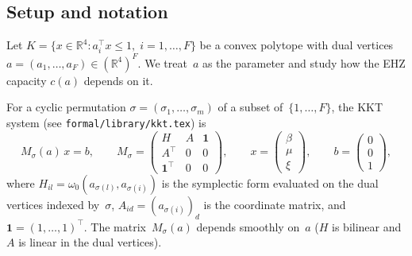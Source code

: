 %
%
%
%



\subsection*{Setup and notation}

Let $K = \{x \in \mathbb{R}^4 : a_i^\top x \leq 1,\; i = 1, \ldots, F\}$
be a convex polytope with dual vertices
$a = (a_1, \ldots, a_F) \in (\mathbb{R}^4)^F$.
We treat~$a$ as the parameter and study how the EHZ capacity
$c(a)$ depends on it.

For a cyclic permutation $\sigma = (\sigma_1, \ldots, \sigma_m)$
of a subset of~$\{1, \ldots, F\}$,
the KKT system (see \texttt{formal/library/kkt.tex}) is
\begin{equation}\label{eq:kkt-system}
  M_\sigma(a)\, x = b,
  \qquad
  M_\sigma = \begin{pmatrix}
    H & A & \mathbf{1} \\
    A^\top & 0 & 0 \\
    \mathbf{1}^\top & 0 & 0
  \end{pmatrix},
  \qquad
  x = \begin{pmatrix} \beta \\ \mu \\ \xi \end{pmatrix},
  \qquad
  b = \begin{pmatrix} 0 \\ 0 \\ 1 \end{pmatrix},
\end{equation}
where $H_{il} = \omega_0(a_{\sigma(l)}, a_{\sigma(i)})$ is the
symplectic form evaluated on the dual vertices indexed by~$\sigma$,
$A_{id} = (a_{\sigma(i)})_d$ is the coordinate matrix,
and $\mathbf{1} = (1, \ldots, 1)^\top$.
The matrix~$M_\sigma(a)$ depends smoothly on~$a$
($H$ is bilinear and $A$ is linear in the dual vertices).

